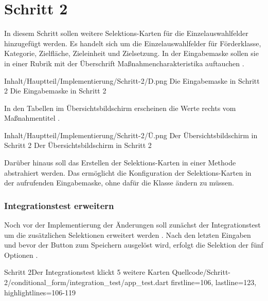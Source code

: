\chapter{Schritt 2}
\label{chap:Schritt-2}



In diesem Schritt sollen weitere Selektions-Karten für die Einzelauswahlfelder hinzugefügt werden.
Es handelt sich um die Einzelauswahlfelder für Förderklasse, Kategorie, Zielfläche, Zieleinheit und Zielsetzung.
In der Eingabemaske sollen sie in einer Rubrik mit der Überschrift  Maßnahmencharakteristika auftauchen \Abb{\ref{fig:Schritt2Eingabemaske}}.

\begin{alexfigure}{Inhalt/Hauptteil/Implementierung/Schritt-2/D.png}
  {Die Eingabemaske in Schritt 2}
  {Die Eingabemaske in Schritt 2}

  \label{fig:Schritt2Eingabemaske}

\end{alexfigure}

In den Tabellen im Übersichtsbildschirm erscheinen  die Werte  rechts  vom Maßnahmentitel \Abb{\ref{fig:Schritt2Uebersicht}}.
\begin{alexfigure}{Inhalt/Hauptteil/Implementierung/Schritt-2/Ü.png}
  {Der Übersichtsbildschirm in Schritt 2}
  {Der Übersichtsbildschirm in Schritt 2}

  \label{fig:Schritt2Uebersicht}

\end{alexfigure}

Darüber hinaus soll das Erstellen der Selektions-Karten in einer Methode abstrahiert werden.
Das ermöglicht die Konfiguration der Selektions-Karten in der aufrufenden Eingabemaske, ohne dafür die Klasse  ändern zu müssen.

\subsection{Integrationstest erweitern}

Noch vor der Implementierung der Änderungen soll zunächst der Integrationstest um die zusätzlichen Selektionen erweitert werden \Lst{\ref{lst:Schritt2IntegrationstestKlickt5WeitereKarten}}. Nach den letzten Eingaben und bevor der Button zum Speichern ausgelöst wird, erfolgt die Selektion der fünf Optionen .   

\begin{alexlisting}{Schritt 2}{Der Integrationstest klickt 5 weitere Karten}
  {Quellcode/Schritt-2/conditional_form/integration_test/app_test.dart}
  {firstline=106, lastline=123, highlightlines={106-119}}
  \label{lst:Schritt2IntegrationstestKlickt5WeitereKarten}
\end{alexlisting}

